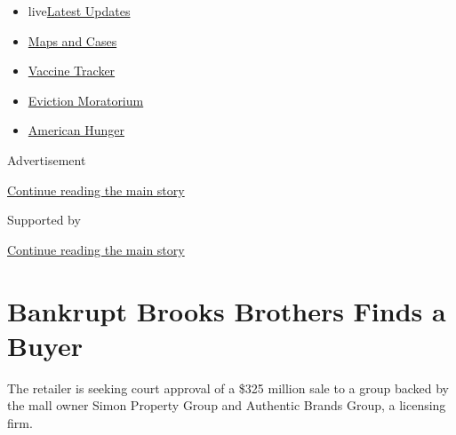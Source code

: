 \begin{itemize}
\tightlist
\item
  live\href{https://www.nytimes3xbfgragh.onion/2020/09/08/world/covid-19-coronavirus.html?name=styln-coronavirus-markets\&region=TOP_BANNER\&block=storyline_menu_recirc\&action=click\&pgtype=Article\&impression_id=634a8f60-f1ca-11ea-b7a9-a937f3428503\&variant=undefined}{Latest
  Updates}
\item
  \href{https://www.nytimes3xbfgragh.onion/interactive/2020/us/coronavirus-us-cases.html?name=styln-coronavirus-markets\&region=TOP_BANNER\&block=storyline_menu_recirc\&action=click\&pgtype=Article\&impression_id=634a8f61-f1ca-11ea-b7a9-a937f3428503\&variant=undefined}{Maps
  and Cases}
\item
  \href{https://www.nytimes3xbfgragh.onion/interactive/2020/science/coronavirus-vaccine-tracker.html?name=styln-coronavirus-markets\&region=TOP_BANNER\&block=storyline_menu_recirc\&action=click\&pgtype=Article\&impression_id=634a8f62-f1ca-11ea-b7a9-a937f3428503\&variant=undefined}{Vaccine
  Tracker}
\item
  \href{https://www.nytimes3xbfgragh.onion/2020/09/02/your-money/eviction-moratorium-covid.html?name=styln-coronavirus-markets\&region=TOP_BANNER\&block=storyline_menu_recirc\&action=click\&pgtype=Article\&impression_id=634a8f63-f1ca-11ea-b7a9-a937f3428503\&variant=undefined}{Eviction
  Moratorium}
\item
  \href{https://www.nytimes3xbfgragh.onion/interactive/2020/09/02/magazine/food-insecurity-hunger-us.html?name=styln-coronavirus-markets\&region=TOP_BANNER\&block=storyline_menu_recirc\&action=click\&pgtype=Article\&impression_id=634a8f64-f1ca-11ea-b7a9-a937f3428503\&variant=undefined}{American
  Hunger}
\end{itemize}

Advertisement

\protect\hyperlink{after-top}{Continue reading the main story}

Supported by

\protect\hyperlink{after-sponsor}{Continue reading the main story}

\hypertarget{bankrupt-brooks-brothers-finds-a-buyer}{%
\section{Bankrupt Brooks Brothers Finds a
Buyer}\label{bankrupt-brooks-brothers-finds-a-buyer}}

The retailer is seeking court approval of a \$325 million sale to a
group backed by the mall owner Simon Property Group and Authentic Brands
Group, a licensing firm.

